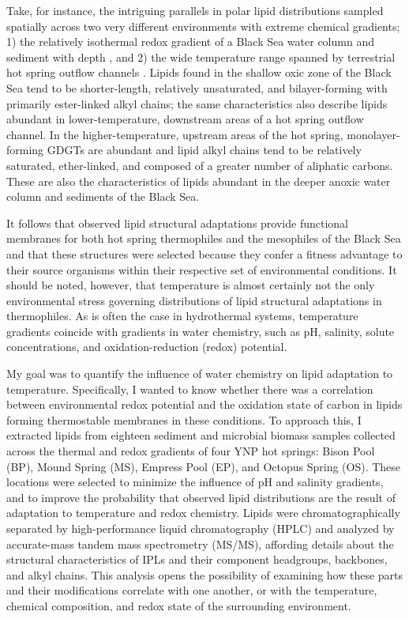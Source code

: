 Take, for instance, the intriguing parallels in polar lipid distributions sampled spatially across two very different environments with extreme chemical gradients; 1) the relatively isothermal redox gradient of a Black Sea water column and sediment with depth \citep{schubotz2009detection, schroder2015intact}, and 2) the wide temperature range spanned by terrestrial hot spring outflow channels \citep{schubotz2013spatial, schubotz2015stable}. Lipids found in the shallow oxic zone of the Black Sea tend to be shorter-length, relatively unsaturated, and bilayer-forming with primarily ester-linked alkyl chains; the same characteristics also describe lipids abundant in lower-temperature, downstream areas of a hot spring outflow channel. In the higher-temperature, upstream areas of the hot spring, monolayer-forming GDGTs are abundant and lipid alkyl chains tend to be relatively saturated, ether-linked, and composed of a greater number of aliphatic carbons. These are also the characteristics of lipids abundant in the deeper anoxic water column and sediments of the Black Sea. 

It follows that observed lipid structural adaptations provide functional membranes for both hot spring thermophiles and the mesophiles of the Black Sea and that these structures were selected because they confer a fitness advantage to their source organisms within their respective set of environmental conditions. It should be noted, however, that temperature is almost certainly not the only environmental stress governing distributions of lipid structural adaptations in thermophiles. As is often the case in hydrothermal systems, temperature gradients coincide with gradients in water chemistry, such as pH, salinity, solute concentrations, and oxidation-reduction (redox) potential.

My goal was to quantify the influence of water chemistry on lipid adaptation to temperature. Specifically, I wanted to know whether there was a correlation between environmental redox potential and the oxidation state of carbon in lipids forming thermostable membranes in these conditions. To approach this, I extracted lipids from eighteen sediment and microbial biomass samples collected across the thermal and redox gradients of four YNP hot springs: Bison Pool (BP), Mound Spring (MS), Empress Pool (EP), and Octopus Spring (OS). These locations were selected to minimize the influence of pH and salinity gradients, and to improve the probability that observed lipid distributions are the result of adaptation to temperature and redox chemistry. Lipids were chromatographically separated by high-performance liquid chromatography (HPLC) and analyzed by accurate-mass tandem mass spectrometry (MS/MS), affording details about the structural characteristics of IPLs and their component headgroups, backbones, and alkyl chains. This analysis opens the possibility of examining how these parts and their modifications correlate with one another, or with the temperature, chemical composition, and redox state of the surrounding environment.

